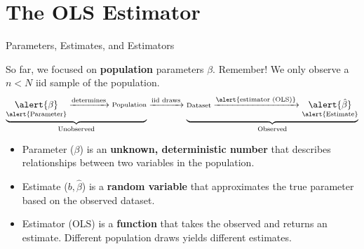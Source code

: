 \documentclass[11pt, aspectratio = 169]{beamer}
\begin{document}
\section{The OLS Estimator}

\begin{frame}{Parameters, Estimates, and Estimators}

So far, we focused on \textbf{population} parameters $\beta$. %
\pause    
Remember! We only observe a $n<N$ iid sample of the population.
\pause
\[
\underbrace{
\underset{\text{\alert{Parameter}}}{\alert{\beta}} 
  \xrightarrow{\text{determines}} \substack{\text{Population}}}_{\text{Unobserved}}
  \xrightarrow{\text{iid draws}} 
  \underbrace{\substack{\text{Dataset}}
  \xrightarrow{\text{\alert{estimator (OLS)}}} 
  \underset{\text{\alert{Estimate}}}{\alert{\hat{\beta}}}}_{\text{Observed}}
\]
\pause
\begin{itemize}
    \item \alert{Parameter ($\beta$)} is an \textbf{unknown, deterministic number} that describes relationships between two variables in the population. \pause
    \item \alert{Estimate ($b, \hat{\beta}$)} is a \textbf{random variable} that approximates the true parameter based on the observed dataset. \pause
    \item \alert{Estimator (OLS)} is a \textbf{function} that takes the observed and returns an estimate. Different population draws yields different estimates. 
\end{itemize}
\end{frame}
\end{document}
